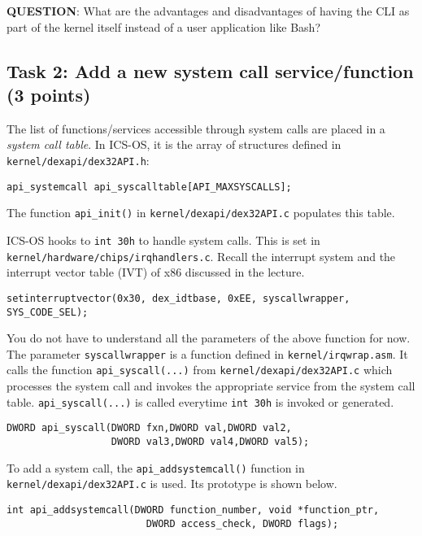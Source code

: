 \documentclass[a4paper, 11pt,oneside]{article}
\begin{document}
\textbf{QUESTION}: What are the advantages and disadvantages of having the CLI as part of the kernel itself instead of a user application like Bash?

\subsection*{Task 2: Add a new system call service/function (3 points)}
The list of functions/services accessible through system calls are placed in a
\textit{system call table}. In ICS-OS, it is the array of structures 
defined in \texttt{kernel/dexapi/dex32API.h}: 

\begin{verbatim}
api_systemcall api_syscalltable[API_MAXSYSCALLS];
\end{verbatim}

The function \texttt{api\_init()} in \texttt{kernel/dexapi/dex32API.c}
populates this table. 

ICS-OS hooks to \texttt{int 30h} to handle system calls. This is set in
\texttt{kernel/hardware/chips/irqhandlers.c}. Recall the interrupt system 
and the interrupt vector table (IVT) of x86 discussed in the lecture.

\begin{verbatim}
setinterruptvector(0x30, dex_idtbase, 0xEE, syscallwrapper, SYS_CODE_SEL); 
\end{verbatim}

You do not have to understand all the parameters of the above function for now. 
The parameter \texttt{syscallwrapper} is a function defined in 
\texttt{kernel/irqwrap.asm}. It calls the function \texttt{api\_syscall(...)} 
from \texttt{kernel/dexapi/dex32API.c} which processes the system call and 
invokes the appropriate service from the system call table. 
\texttt{api\_syscall(...)} is called everytime \texttt{int 30h} is invoked or  
generated.

\begin{verbatim}
DWORD api_syscall(DWORD fxn,DWORD val,DWORD val2,
                  DWORD val3,DWORD val4,DWORD val5);
\end{verbatim}


To add a system call, the \texttt{api\_addsystemcall()} function in 
\texttt{kernel/dexapi/dex32API.c} is used. Its prototype is shown below.
\begin{verbatim}
int api_addsystemcall(DWORD function_number, void *function_ptr,
                        DWORD access_check, DWORD flags);
\end{verbatim}
\end{document}

